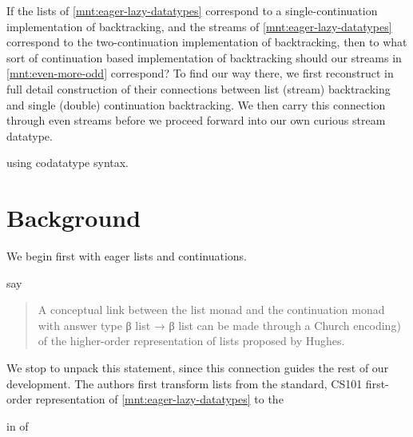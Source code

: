 \documentclass[screen,anonymous,review,draft,natbib=false]{acmart} %
\begin{document}
If the lists of \cref{mnt:eager-lazy-datatypes} correspond to a
single-continuation implementation of backtracking, and the streams of
\cref{mnt:eager-lazy-datatypes} correspond to the two-continuation
implementation of backtracking, then to what sort of continuation
based implementation of backtracking should our streams in
\cref{mnt:even-more-odd} correspond? To find our way there, we first
reconstruct in full detail  construction
of their connections between list (stream) backtracking and single
(double) continuation backtracking. We then carry this connection
through  even streams before we proceed
forward into our own curious stream datatype.

using  codatatype syntax.

\section{Background}\label{sec:background}

We begin first with eager lists and continuations.

\citeauthor{danvy2002unifying} say
%
\begin{quote}
  A conceptual link between the list monad and the continuation monad
  with answer type β list → β list can be made through a Church
  encoding) of the higher-order representation of lists proposed by
  Hughes.
\end{quote}

We stop to unpack this statement, since this connection guides the
rest of our development. The authors first transform lists from the
standard, CS101 first-order representation of
\cref{mnt:eager-lazy-datatypes} to the 

in of
\end{document}
